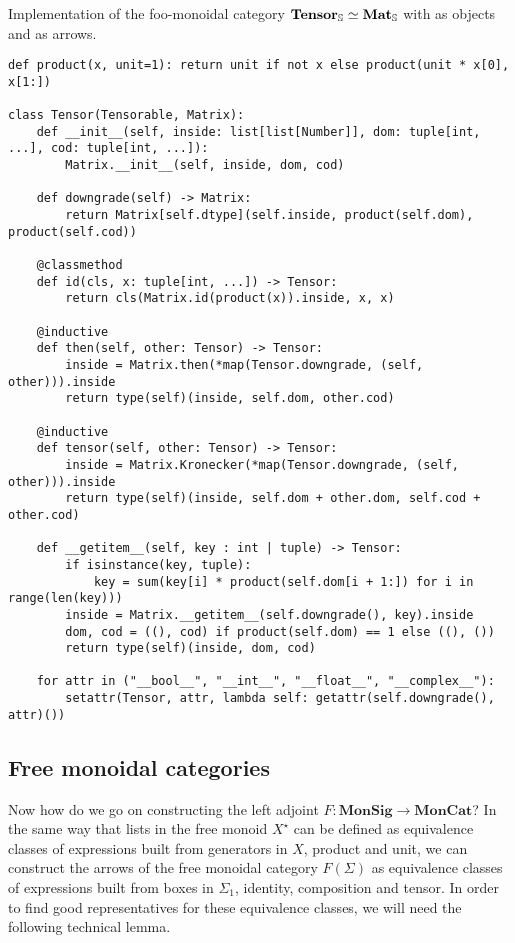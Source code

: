\begin{python}\label{listing:tensor}
{\normalfont Implementation of the foo-monoidal category $\mathbf{Tensor}_\S \simeq \mathbf{Mat}_\S$ with  as objects and  as arrows.}

\begin{verbatim}
def product(x, unit=1): return unit if not x else product(unit * x[0], x[1:])

class Tensor(Tensorable, Matrix):
    def __init__(self, inside: list[list[Number]], dom: tuple[int, ...], cod: tuple[int, ...]):
        Matrix.__init__(self, inside, dom, cod)

    def downgrade(self) -> Matrix:
        return Matrix[self.dtype](self.inside, product(self.dom), product(self.cod))

    @classmethod
    def id(cls, x: tuple[int, ...]) -> Tensor:
        return cls(Matrix.id(product(x)).inside, x, x)

    @inductive
    def then(self, other: Tensor) -> Tensor:
        inside = Matrix.then(*map(Tensor.downgrade, (self, other))).inside
        return type(self)(inside, self.dom, other.cod)

    @inductive
    def tensor(self, other: Tensor) -> Tensor:
        inside = Matrix.Kronecker(*map(Tensor.downgrade, (self, other))).inside
        return type(self)(inside, self.dom + other.dom, self.cod + other.cod)

    def __getitem__(self, key : int | tuple) -> Tensor:
        if isinstance(key, tuple):
            key = sum(key[i] * product(self.dom[i + 1:]) for i in range(len(key)))
        inside = Matrix.__getitem__(self.downgrade(), key).inside
        dom, cod = ((), cod) if product(self.dom) == 1 else ((), ())
        return type(self)(inside, dom, cod)

    for attr in ("__bool__", "__int__", "__float__", "__complex__"):
        setattr(Tensor, attr, lambda self: getattr(self.downgrade(), attr)())
\end{verbatim}
\end{python}

\subsection{Free monoidal categories}

Now how do we go on constructing the left adjoint $F : \mathbf{MonSig} \to \mathbf{MonCat}$?
In the same way that lists in the free monoid $X^\star$ can be defined as equivalence classes of expressions built from generators in $X$, product and unit, we can construct the arrows of the free monoidal category $F(\Sigma)$ as equivalence classes of expressions built from boxes in $\Sigma_1$, identity, composition and tensor.
In order to find good representatives for these equivalence classes, we will need the following technical lemma.

